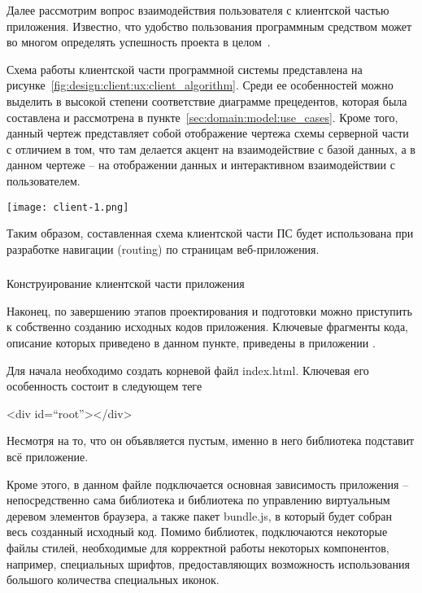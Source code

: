 Далее рассмотрим вопрос взаимодействия пользователя с клиентской частью приложения. Известно, что удобство пользования программным средством может во многом определять успешность проекта в целом~\cite[с.~44]{code_complete}.

Схема работы клиентской части программной системы представлена на рисунке~\ref{fig:design:client:ux:client_algorithm}. Среди ее особенностей можно выделить в высокой степени соответствие диаграмме прецедентов, которая была составлена и рассмотрена в пункте~\ref{sec:domain:model:use_cases}. Кроме того, данный чертеж представляет собой отображение чертежа схемы серверной части с отличием в том, что там делается акцент на взаимодействие с базой данных, а в данном чертеже -- на отображении данных и интерактивном взаимодействии с пользователем. 

\begin{sidewaysfigure}
\centering
	\texttt{[image: client-1.png]}
	\caption{Схема программы клиентской части программного средства}
	\label{fig:design:client:ux:client_algorithm}
\end{sidewaysfigure}

Таким образом, составленная схема клиентской части ПС будет использована при разработке навигации (routing) по страницам веб-приложе\-ния.

\subsubsection{} Конструирование клиентской части приложения
\label{sec:design:client:development}

Наконец, по завершению этапов проектирования и подготовки можно приступить к собственно созданию исходных кодов приложения. Ключевые фрагменты кода, описание которых приведено в данном пункте, приведены в приложении \sourcecodeappendix.

Для начала необходимо создать корневой файл index.html. Ключевая его особенность состоит в следующем теге
\begin{flushleft}
\qquad\qquad\qquad\qquad\qquad <div id=``root''></div>
\end{flushleft}

Несмотря на то, что он объявляется пустым, именно в него библиотека \react подставит всё приложение.

Кроме этого, в данном файле подключается основная зависимость приложения -- непосредственно сама библиотека \react и библиотека по управлению виртуальным деревом элементов браузера, а также пакет bun\-dle.js, в который будет собран весь созданный исходный код. Помимо библиотек, подключаются некоторые файлы стилей, необходимые для корректной работы некоторых компонентов, например, специальных шрифтов, предоставляющих возможность использования большого количества специальных иконок.

